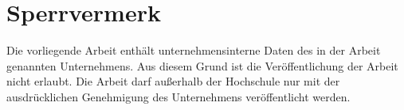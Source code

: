 \section*{Sperrvermerk}

Die vorliegende Arbeit enthält unternehmensinterne Daten des in der Arbeit
genannten Unternehmens. Aus diesem Grund ist die Veröffentlichung der
Arbeit nicht erlaubt. Die Arbeit darf außerhalb der Hochschule nur mit der
ausdrücklichen Genehmigung des Unternehmens veröffentlicht werden.
